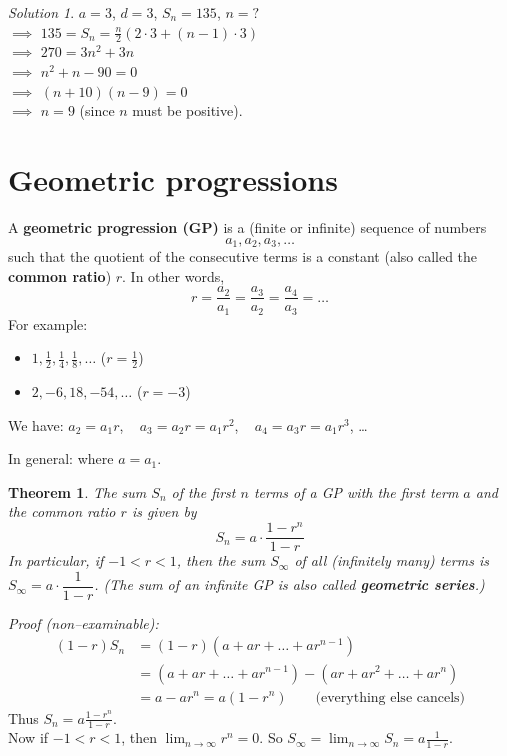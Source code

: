 \documentclass[
  12pt,
  oneside]{book}
\providecommand{\tightlist}{%
  \setlength{\itemsep}{0pt}\setlength{\parskip}{0pt}}
\newtheorem{theorem}{Theorem}[chapter]
\theoremstyle{definition}
\theoremstyle{definition}
\theoremstyle{definition}
\theoremstyle{definition}
\theoremstyle{remark}
\newtheorem*{solution}{Solution}
\begin{document}
\begin{solution}
\(a=3\), \(d=3\), \(S_n=135\), \(n=?\)\\
\(\implies\) \(135 = S_n = \frac{n}{2}(2\cdot 3+(n-1)\cdot 3)\)\\
\(\implies\) \(270 = 3n^2 + 3n\)\\
\(\implies\) \(n^2+n-90 = 0\)\\
\(\implies\) \((n+10)(n-9)=0\)\\
\(\implies\) \(n=9\) (since \(n\) must be positive).
\end{solution}

\section{Geometric progressions}\label{geometric-progressions}

A \textbf{geometric progression (GP)} is a (finite or infinite) sequence of numbers
\[
a_1,a_2,a_3,\dots
\]
such that the quotient of the consecutive terms is a constant (also called the \textbf{common ratio}) \(r\). In other words,
\[
r = \frac{a_2}{a_1} = \frac{a_3}{a_2} = \frac{a_4}{a_3} = \dots
\]
For example:

\begin{itemize}
\tightlist
\item
  \(1,\frac12,\frac14,\frac18,\dots\) \quad (\(r=\frac12\))
\item
  \(2,-6,18,-54,\dots\) \quad (\(r=-3\))
\end{itemize}

We have: \(a_2=a_1r\), ~ \(a_3=a_2r = a_1r^2\), ~ \(a_4=a_3r=a_1r^3\), \dots

In general:  where \(a=a_1\).

\begin{theorem}
The sum \(S_n\) of the first \(n\) terms of a GP with the first
term \(a\) and the common ratio \(r\) is given by
\[
\boxed{S_n = a\cdot \frac{1-r^n}{1-r}}
\]
In particular, if \(-1<r<1\), then the sum \(S_\infty\) of all (infinitely many) terms is \(S_\infty = a\cdot\dfrac{1}{1-r}\). (The sum of an infinite GP is also called \textbf{geometric series}.)
\end{theorem}

\emph{Proof (non--examinable):}
\begin{align*}
    (1-r)S_n &= (1-r)(a+ar+\dots+ar^{n-1})\\
     &= (a+ar+\dots+ar^{n-1}) - (ar + ar^2 +\dots +ar^n) \\
     &= a-ar^n = a(1-r^n) \qquad\text{(everything else cancels)}
\end{align*}
Thus \(S_n = a\frac{1-r^n}{1-r}\).\\
Now if \(-1<r<1\), then \(\lim_{n\to\infty}r^n=0\). So \(S_\infty=\lim_{n\to\infty}S_n = a\frac{1}{1-r}\).
\end{document}
